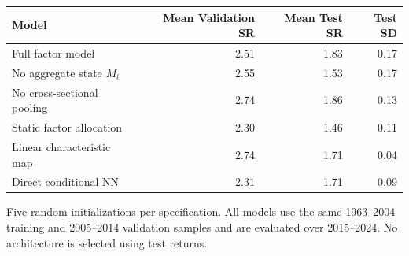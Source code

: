\begin{threeparttable}
\begin{tabular}{lrrr}
\toprule
Model & Mean Validation SR & Mean Test SR & Test SD \\
\midrule
Full factor model & 2.51 & 1.83 & 0.17 \\
No aggregate state $M_t$ & 2.55 & 1.53 & 0.17 \\
No cross-sectional pooling & 2.74 & 1.86 & 0.13 \\
Static factor allocation & 2.30 & 1.46 & 0.11 \\
Linear characteristic map & 2.74 & 1.71 & 0.04 \\
Direct conditional NN & 2.31 & 1.71 & 0.09 \\
\bottomrule
\end{tabular}
\begin{tablenotes}\footnotesize\item Five random initializations per specification. All models use the same 1963--2004 training and 2005--2014 validation samples and are evaluated over 2015--2024. No architecture is selected using test returns.\end{tablenotes}
\end{threeparttable}
